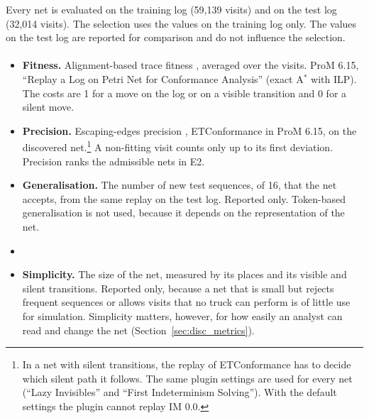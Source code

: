 Every net is evaluated on the training log (59,139 visits) and on the test log
(32,014 visits). The selection uses the values on the training log only. The values
on the test log are reported for comparison and do not influence the selection.

\paragraph{}
\begin{itemize}
\item \textbf{Fitness.} Alignment-based trace fitness
\cite{Adriansyah2011CostFitness}, averaged over the visits. ProM 6.15, ``Replay a
Log on Petri Net for Conformance Analysis'' (exact A$^*$ with ILP). The costs are 1
for a move on the log or on a visible transition and 0 for a silent move. 
\item \textbf{Precision.} Escaping-edges precision \cite{MunozGama2010FreshLook},
ETConformance in ProM 6.15, on the discovered net.\footnote{In a net with silent
transitions, the replay of ETConformance has to decide which silent path it
follows. The same plugin settings are used for every net (``Lazy Invisibles'' and
``First Indeterminism Solving''). With the default settings the plugin cannot
replay IM 0.0.} A non-fitting visit counts only up to its first deviation. Precision
ranks the admissible nets in E2.
\item \textbf{Generalisation.} The number of new test sequences, of 16, that the
net accepts, from the same replay on the test log. Reported only. Token-based
generalisation \cite{Buijs2014Quality} is not used, because it depends on the
representation of the net.
\item {}
\item \textbf{Simplicity.} The size of the net, measured by its places and its
visible and silent transitions. Reported only, because a net that is small but
rejects frequent sequences or allows visits that no truck can perform is of little
use for simulation. Simplicity matters, however, for how easily an analyst can read
and change the net (Section~\ref{sec:disc_metrics}).
\end{itemize}


